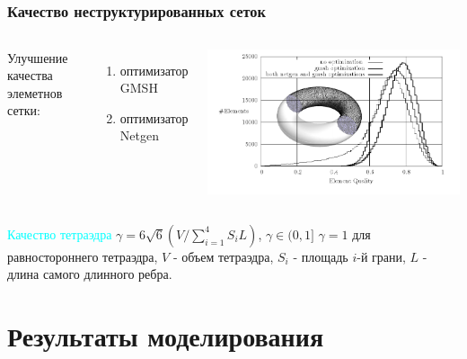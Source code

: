 \documentclass[ucs]{beamer}
\begin{document}
\subsection{}
\begin{frame}
	\frametitle{Качество неструктурированных сеток}
	\begin{columns}
	Улучшение качества элеметнов сетки:
	\begin{enumerate}
	\item оптимизатор GMSH
	\item оптимизатор Netgen
	\end{enumerate}
		\includegraphics[width=\columnwidth]{optimizers.png}
	\end{columns}
	\textcolor{cyan}{Качество тетраэдра} $\gamma=6 \sqrt{6} (V/\displaystyle\sum_{i=1}^4 S_i L)$, $\gamma \in (0,1]$\newline
	$\gamma = 1$ для равностороннего тетраэдра,\newline
	$V$ - объем тетраэдра,\newline
	$S_i$ - площадь $i$-й грани,\newline
	$L$ - длина самого длинного ребра.\newline
\end{frame}

\section{Результаты моделирования}
\end{document}
